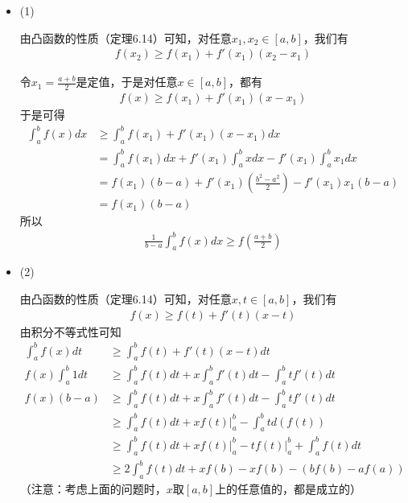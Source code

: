 \documentclass{article}
\begin{document}
\begin{itemize}
  \item (1)

        由凸函数的性质（定理6.14）可知，对任意$x_1, x_2 \in [a, b]$，我们有
        \begin{align*}
          f(x_2) \geq f(x_1) + f'(x_1)(x_2 - x_1)
        \end{align*}

        令$x_1 = \frac{a + b}{2}$是定值，于是对任意$x \in [a, b]$，都有
        \begin{align*}
          f(x) \geq f(x_1) + f'(x_1)(x - x_1)
        \end{align*}
        于是可得
        \begin{align*}
          \int_{a}^{b} f(x) dx
           & \geq \int_{a}^{b} f(x_1) + f'(x_1)(x - x_1) dx                                     \\
           & = \int_{a}^{b} f(x_1) dx + f'(x_1) \int_{a}^{b} x dx - f'(x_1) \int_{a}^{b} x_1 dx \\
           & = f(x_1)(b - a) + f'(x_1) (\frac{b^2 - a^2}{2}) - f'(x_1) x_1 (b - a)              \\
           & = f(x_1)(b - a)
        \end{align*}
        所以
        \begin{align*}
          \frac{1}{b - a} \int_{a}^{b} f(x) dx \geq f(\frac{a + b}{2})
        \end{align*}

  \item (2)

        由凸函数的性质（定理6.14）可知，对任意$x, t \in [a, b]$，我们有
        \begin{align*}
          f(x) \geq f(t) + f'(t)(x - t)
        \end{align*}
        由积分不等式性可知
        \begin{align*}
          \int_{a}^{b} f(x) dt   & \geq \int_{a}^{b} f(t) + f'(t)(x - t) dt                                                \\
          f(x) \int_{a}^{b} 1 dt & \geq \int_{a}^{b} f(t) dt + x \int_{a}^{b} f'(t) dt - \int_{a}^{b} t f'(t) dt           \\
          f(x) (b - a)           & \geq \int_{a}^{b} f(t) dt + x \int_{a}^{b} f'(t) dt - \int_{a}^{b} t f'(t) dt           \\
                                 & \geq \int_{a}^{b} f(t) dt + x f(t) \bigg|_a^b - \int_{a}^{b} t d(f(t))                  \\
                                 & \geq \int_{a}^{b} f(t) dt + x f(t) \bigg|_a^b - t f(t)\bigg|_a^b + \int_{a}^{b} f(t) dt \\
                                 & \geq 2 \int_{a}^{b} f(t) dt + xf(b) - xf(b) - (bf(b) - af(a))
        \end{align*}
        （注意：考虑上面的问题时，$x$取$[a, b]$上的任意值的，都是成立的）


\end{itemize}
\end{document}
